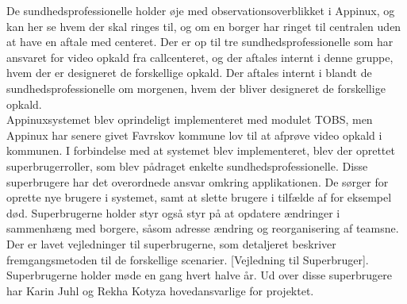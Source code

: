 De sundhedsprofessionelle holder øje med observationsoverblikket i Appinux, og kan her se hvem der skal ringes til, og om en borger har ringet til centralen uden at have en aftale med centeret. Der er op til tre sundhedsprofessionelle som har ansvaret for video opkald fra callcenteret, og der aftales internt i denne gruppe, hvem der er designeret de forskellige opkald.  Der aftales internt i blandt de sundhedsprofessionelle om morgenen, hvem der bliver designeret de forskellige opkald. \\
Appinuxsystemet blev oprindeligt implementeret med modulet TOBS, men Appinux har senere givet Favrskov kommune lov til at afprøve video opkald i kommunen. I forbindelse med at systemet blev implementeret, blev der oprettet superbrugerroller, som blev pådraget enkelte sundhedsprofessionelle. Disse superbrugere har det overordnede ansvar omkring applikationen. De sørger for oprette nye brugere i systemet, samt at slette brugere i tilfælde af for eksempel død. Superbrugerne holder styr også styr på at opdatere ændringer i sammenhæng med borgere, såsom adresse ændring og reorganisering af teamsne. \\
Der er lavet vejledninger til superbrugerne, som detaljeret beskriver fremgangsmetoden til de forskellige scenarier. [Vejledning til Superbruger]. Superbrugerne holder møde en gang hvert halve år. Ud over disse superbrugere har Karin Juhl og Rekha Kotyza hovedansvarlige for projektet. \\


